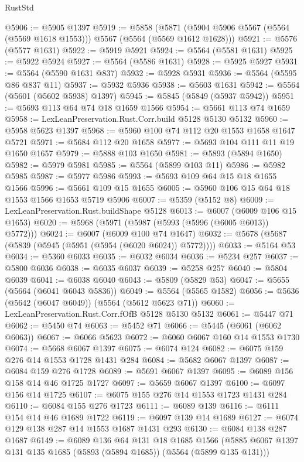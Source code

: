 \begin{lexlean}{RustStd}
\begin{coremodule}
{\begin{coremodule}
{{{{{{{{{{{{{{{{{{{{{{{{{{{{{{{{@5906 := @5905 @1397
@5919 := @5858
    (@5871 (@5904 @5906 @5567 (@5564 (@5569 @1618 @1553))) @5567 (@5564 (@5569 @1612 @1628)))
@5921 := @5576 (@5577 @1631)
@5922 := @5919 @5921
@5924 := @5564 (@5581 @1631)
@5925 := @5922 @5924
@5927 := @5564 (@5586 @1631)
@5928 := @5925 @5927
@5931 := @5564 (@5590 @1631 @837)
@5932 := @5928 @5931
@5936 := @5564 (@5595 @86 @837 @11)
@5937 := @5932 @5936
@5938 := @5603 @1631
@5942 := @5564 (@5601 (@5602 @5938) @1397)
@5945 := @5845 (@5849 (@5937 @5942))
@5951 := @5693 @113 @64 @74 @18 @1659 @1566
@5954 := @5661 @113 @74 @1659
@5958 := LexLeanPreservation.Rust.Corr.build @5128 @5130 @5132
@5960 := @5958 @5623 @1397
@5968 := @5960 @100 @74 @112 @20 @1553 @1658 @1647 @5721
@5971 := @5684 @112 @20 @1658
@5977 := @5693 @104 @111 @11 @19 @1650 @1657
@5979 := @5888 @103 @1650
@5981 := @5893 (@5894 @1650)
@5982 := @5979 @5981
@5985 := @5564 (@5899 @103 @11)
@5986 := @5982 @5985
@5987 := @5977 @5986
@5993 := @5693 @109 @64 @15 @18 @1655 @1566
@5996 := @5661 @109 @15 @1655
@6005 := @5960 @106 @15 @64 @18 @1553 @1566 @1653 @5719 @5906
@6007 := @5359 (@5152 @8)
@6009 := LexLeanPreservation.Rust.buildShape @5128
@6013 := @6007 (@6009 @106 @15 @1653)
@6020 := @5968 (@5971 (@5987 (@5993 (@5996 (@6005 @6013)) @5772)))
@6024 := @6007 (@6009 @100 @74 @1647)
@6032 := @5678 (@5687 (@5839 (@5945 (@5951 (@5954 (@6020 @6024)) @5772))))
@6033 := @5164 @53
@6034 := @5360 @6033
@6035 := @6032 @6034
@6036 := @5234 @257
@6037 := @5800 @6036
@6038 := @6035 @6037
@6039 := @5258 @257
@6040 := @5804 @6039
@6041 := @6038 @6040
@6043 := @5809 (@5829 @53)
@6047 := @5655 (@5664 (@6041 @6043 @5836))
@6049 := @5564 (@5565 @1582)
@6056 := @5636 (@5642 (@6047 @6049)) (@5564 (@5612 @5623 @71))
@6060 := LexLeanPreservation.Rust.Corr.fOfB @5128 @5130 @5132
@6061 := @5447 @71
@6062 := @5450 @74
@6063 := @5452 @71
@6066 := @5445 (@6061 (@6062 @6063))
@6067 := @6066 @5623
@6072 := @6060 @6067 @160 @14 @1553 @1730
@6074 := @5668 @6067 @1397
@6075 := @6074 @124
@6082 := @6075 @159 @276 @14 @1553 @1728 @1431 @284
@6084 := @5682 @6067 @1397
@6087 := @6084 @159 @276 @1728
@6089 := @5691 @6067 @1397
@6095 := @6089 @156 @158 @14 @46 @1725 @1727
@6097 := @5659 @6067 @1397
@6100 := @6097 @156 @14 @1725
@6107 := @6075 @155 @276 @14 @1553 @1723 @1431 @284
@6110 := @6084 @155 @276 @1723
@6111 := @6089 @139
@6116 := @6111 @154 @14 @46 @1689 @1722
@6119 := @6097 @139 @14 @1689
@6127 := @6074 @129 @138 @287 @14 @1553 @1687 @1431 @293
@6130 := @6084 @138 @287 @1687
@6149 := @6089
    @136
    @64
    @131
    @18
    @1685
    @1566
    (@5885 @6067 @1397 @131 @135 @1685 (@5893 (@5894 @1685)) (@5564 (@5899 @135 @131)))
}}}}}}}}}}}}}}}}}}}}}}}}}}}}}}}}
\end{coremodule}}
\end{coremodule}
\end{lexlean}
